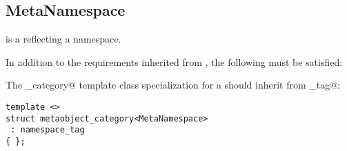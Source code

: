 \subsection{MetaNamespace}
\label{concept-MetaNamespace}

 is a  reflecting a namespace.

In addition to the requirements inherited from , the following must
be satisfied:

The \verb@metaobject_category@ template class specialization for a  should
inherit from \verb@namespace_tag@:

\begin{verbatim}
template <>
struct metaobject_category<MetaNamespace>
 : namespace_tag
{ };
\end{verbatim}

